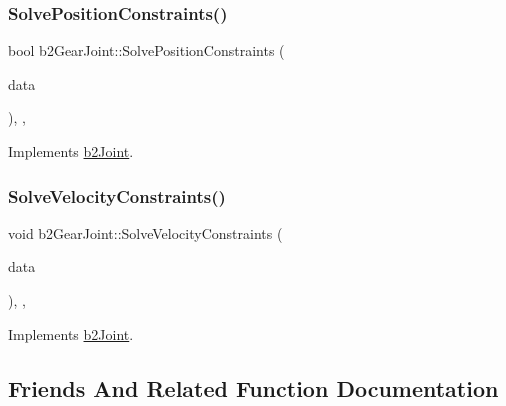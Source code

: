\subsubsection{\texorpdfstring{SolvePositionConstraints()}{SolvePositionConstraints()}}
{\footnotesize\ttfamily bool b2\+Gear\+Joint\+::\+Solve\+Position\+Constraints (\begin{DoxyParamCaption}\item[{const \mbox{\hyperlink{structb2_solver_data}{b2\+Solver\+Data}} \&}]{data }\end{DoxyParamCaption})\hspace{0.3cm}{\ttfamily [override]}, {\ttfamily [protected]}, {\ttfamily [virtual]}}



Implements \mbox{\hyperlink{classb2_joint_af767ac9aa494bd15cdf83dfe3e487d9c}{b2\+Joint}}.

\mbox{\label{classb2_gear_joint_a25ff465354108f5ae2b60fb9f7836820}} 
\subsubsection{\texorpdfstring{SolveVelocityConstraints()}{SolveVelocityConstraints()}}
{\footnotesize\ttfamily void b2\+Gear\+Joint\+::\+Solve\+Velocity\+Constraints (\begin{DoxyParamCaption}\item[{const \mbox{\hyperlink{structb2_solver_data}{b2\+Solver\+Data}} \&}]{data }\end{DoxyParamCaption})\hspace{0.3cm}{\ttfamily [override]}, {\ttfamily [protected]}, {\ttfamily [virtual]}}



Implements \mbox{\hyperlink{classb2_joint_ad302c8d02efcfe934158de0dc429348d}{b2\+Joint}}.



\subsection{Friends And Related Function Documentation}
\mbox{\label{classb2_gear_joint_a54ade8ed3d794298108d7f4c4e4793fa}} 
